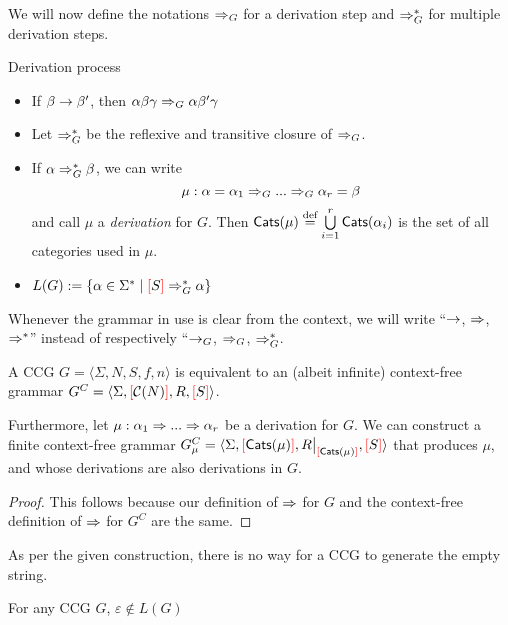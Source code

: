 \documentclass[main.tex]{subfiles}
\begin{document}
We will now define the notations $\Rightarrow_G$ for a derivation step
and $\Rightarrow^*_G$ for multiple derivation steps.
\begin{defn}
    Derivation process
    \begin{itemize}
        \item If $\beta \rightarrow \beta'$, then $\alpha \beta \gamma \Rightarrow_G \alpha \beta' \gamma$
        \item Let $\Rightarrow^*_G$ be the reflexive and transitive closure of $\Rightarrow_G$.
        \item If $\alpha \Rightarrow^*_G \beta$, we can write
            \[ \mu: \alpha = \alpha_1 \Rightarrow_G ... \Rightarrow_G \alpha_r = \beta \]
            and call $\mu$ a \emph{derivation} for $G$. Then $\mathsf{Cats}( \mu ) \overset{\text{\scriptsize def}}{=} \bigcup\limits_{i=1}^{r} \mathsf{Cats}( \alpha_i )$
            is the set of all categories used in $\mu$.
        \item $L(G) := \{ \alpha \in \Sigma^* \mid \textcolor{red}{[} S \textcolor{red}{]} \Rightarrow^*_G \alpha \}$
    \end{itemize}
\end{defn}

\begin{convention}
    Whenever the grammar in use is clear from the context, we will write
    ``$\rightarrow$, $\Rightarrow$, $\Rightarrow^*$'' instead of respectively
    ``$\rightarrow_G$, $\Rightarrow_G$, $\Rightarrow^*_G$.
\end{convention}

\begin{prop}\label{prop:cfg}
    A CCG $G = \langle \Sigma, N, S, f, n \rangle$ is equivalent to an
    (albeit infinite) context-free grammar
    $G^C = \langle \Sigma, \textcolor{red}{[} \mathcal{C}( N ) \textcolor{red}{]}, R, \textcolor{red}{[} S \textcolor{red}{]} \rangle$.

    Furthermore, let $\mu: \alpha_1 \Rightarrow ... \Rightarrow \alpha_r$
    be a derivation for $G$.
    We can construct a finite context-free grammar
    $G_\mu^C = \langle \Sigma, \lb \catsin{\mu} \rb, \restr{R}{\lb \catsin{\mu} \rb}, \lb S \rb \rangle$
    that produces $\mu$, and whose derivations are also derivations in $G$.
\end{prop}
\begin{proof}
    This follows because our definition of $\Rightarrow$ for $G$ and the context-free
    definition of $\Rightarrow$ for $G^C$ are the same.
\end{proof}

As per the given construction, there is no way for a CCG to generate the empty
string.
\begin{property}
    For any CCG $G$, $\varepsilon \notin L(G)$
\end{property}
\end{document}
